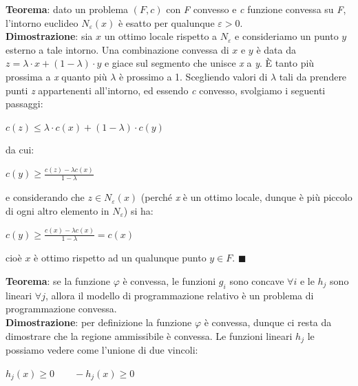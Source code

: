 \documentclass[11pt, oneside]{book}
\begin{document}
\par\bigskip

{\bf Teorema}: dato un problema $(F,c)$ con {\em F} convesso e {\em c}
funzione convessa su {\em F}, l'intorno euclideo $N_\varepsilon(x)$
\`e esatto per qualunque $\varepsilon > 0$.\\
{\bf Dimostrazione}: sia $x$ un ottimo locale rispetto a
$N_\varepsilon$ e consideriamo un punto $y$ esterno a tale
intorno. Una combinazione convessa di $x$ e $y$ \`e data da $z =
\lambda\cdot x + (1-\lambda)\cdot y$ e giace sul segmento che unisce {\em x}
 a {\em y}. \`E tanto pi\`u prossima a {\em x} quanto pi\`u $\lambda$
 \`e prossimo a 1. Scegliendo valori di $\lambda$ tali da prendere
 punti {\em z} appartenenti all'intorno, ed essendo {\em c} convesso,
 svolgiamo i seguenti passaggi:

 \begin{center}
$c(z) \leq \lambda\cdot c(x) + (1-\lambda)\cdot c(y)$
 \end{center}

\noindent da cui:

\begin{center}
$c(y) \geq \frac{c(z)-\lambda c(x)}{1-\lambda}$  
\end{center}

\noindent e considerando che $z \in N_\varepsilon(x)$ (perch\'e {\em x} \`e un
ottimo locale, dunque \`e pi\`u piccolo di ogni altro elemento in
$N_\varepsilon$) si ha:

\begin{center}
$c(y) \geq \frac{c(x)-\lambda c(x)}{1-\lambda} = c(x)$   
\end{center}

\noindent cio\`e $x$ \`e ottimo rispetto ad un qualunque punto $y \in
F$. $\blacksquare$

\par\bigskip

{\bf Teorema}: se la funzione $\varphi$ \`e convessa, le funzioni $g_i$
sono concave $\forall i$ e le $h_j$ sono lineari $\forall j$, allora
il modello di programmazione relativo \`e un problema di
programmazione convessa.\\
{\bf Dimostrazione}: per definizione la funzione $\varphi$ \`e convessa,
dunque ci resta da dimostrare che la regione ammissibile \`e
convessa. Le funzioni lineari $h_j$ le possiamo vedere come l'unione
di due vincoli:

\begin{center}
$h_j(x) \geq 0 \qquad -h_j(x) \geq 0$  
\end{center}
\end{document}
